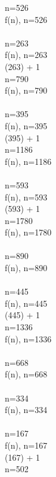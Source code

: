 \documentclass{article}
\begin{document}
 \Rightarrow n=526
 \\[3mm] 
f(n), n=526
 \\ 
 \Rightarrow {} 
 \\ 
 \Rightarrow n=263
 \\[3mm] 
f(n), n=263
 \\ 
 (263) + 1
 \\ 
 \Rightarrow n=790
 \\[3mm] 
f(n), n=790
 \\ 
 \Rightarrow {} 
 \\ 
 \Rightarrow n=395
 \\[3mm] 
f(n), n=395
 \\ 
 (395) + 1
 \\ 
 \Rightarrow n=1186
 \\[3mm] 
f(n), n=1186
 \\ 
 \Rightarrow {} 
 \\ 
 \Rightarrow n=593
 \\[3mm] 
f(n), n=593
 \\ 
 (593) + 1
 \\ 
 \Rightarrow n=1780
 \\[3mm] 
f(n), n=1780
 \\ 
 \Rightarrow {} 
 \\ 
 \Rightarrow n=890
 \\[3mm] 
f(n), n=890
 \\ 
 \Rightarrow {} 
 \\ 
 \Rightarrow n=445
 \\[3mm] 
f(n), n=445
 \\ 
 (445) + 1
 \\ 
 \Rightarrow n=1336
 \\[3mm] 
f(n), n=1336
 \\ 
 \Rightarrow {} 
 \\ 
 \Rightarrow n=668
 \\[3mm] 
f(n), n=668
 \\ 
 \Rightarrow {} 
 \\ 
 \Rightarrow n=334
 \\[3mm] 
f(n), n=334
 \\ 
 \Rightarrow {} 
 \\ 
 \Rightarrow n=167
 \\[3mm] 
f(n), n=167
 \\ 
 (167) + 1
 \\ 
 \Rightarrow n=502
 \\[3mm] 
\end{document}
